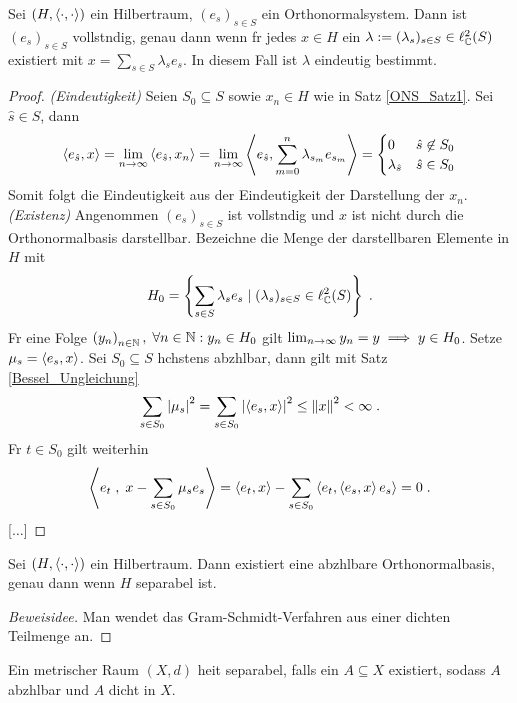 \begin{theorem}
Sei \((H,\left\langle\cdot, \cdot\right\rangle)\) ein Hilbertraum, \((e_s)_{s\in S}\) ein Orthonormalsystem. Dann ist \((e_s)_{s\in S}\) vollst\as ndig, genau dann wenn f\us r jedes \(x\in H\) ein \(\lambda := (\lambda_s)_{s\in S} \in \ell_{\mathbb{C}}^2(S)\) existiert mit \(x = \sum_{s\in S} \lambda_s e_s\). In diesem Fall ist \(\lambda\) eindeutig bestimmt.
\end{theorem}
\begin{proof}
	\textit{(Eindeutigkeit)} Seien \(S_0 \subseteq S\) sowie \(x_n \in H\) wie in Satz \ref{ONS_Satz1}. Sei \(\hat s \in S\), dann
	\[\left\langle e_{\hat s}, x\right\rangle = \lim_{n \to\infty} \left\langle e_{\hat s}, x_n\right\rangle = \lim_{n \to\infty} \left\langle e_{\hat s}, \sum_{m=0}^n \lambda_{s_m} e_{s_m}\right\rangle= \begin{cases}0 & \hat s\not\in S_0 \\ \lambda_{\hat s} & \hat s \in S_0\end{cases}\]
	Somit folgt die Eindeutigkeit aus der Eindeutigkeit der Darstellung der \(x_n\).\\
	\textit{(Existenz)}
	Angenommen \((e_s)_{s\in S} \) ist vollst\as ndig und \(x\) ist nicht durch die Orthonormalbasis darstellbar. Bezeichne die Menge der darstellbaren Elemente in $H$ mit
	\[H_0 = \left\{\sum_{s\in S} \lambda_s e_s \;\vert\; (\lambda_s)_{s\in S} \in \ell^2_{\mathbb{C}}(S)\right\}\;.\]	
	F\us r eine Folge \(\left (y_n\right )_{n\in \mathbb{N}},\; \forall n \in \mathbb{N}: y_n \in H_0\) gilt \(\lim_{n \to \infty} y_n = y \implies y \in H_0\). Setze \(\mu_s = \left\langle e_s, x\right\rangle\). Sei \(S_0 \subseteq S\) h\os chstens abz\as hlbar, dann gilt mit Satz \ref{Bessel_Ungleichung}
	\[\sum_{s\in S_0} \left\lvert \mu_s \right\rvert^2 = \sum_{s\in S_0} \left\lvert \left\langle e_s, x\right\rangle \right\rvert^2 \leq \left\lVert x\right\rVert^2 < \infty\;.\]
	F\us r \(t\in S_0\) gilt weiterhin
	\[\left\langle e_t\;, \;x - \sum_{s\in S_0} \mu_s e_s\right\rangle = \left\langle e_t,x\right\rangle - \sum_{s\in S_0} \left\langle e_t,\left\langle e_s, x\right\rangle e_s\right\rangle = 0 \;. \]
	[\(\ldots\)]
\end{proof}

\begin{theorem}
	Sei \((H,\left\langle\cdot, \cdot\right\rangle)\) ein Hilbertraum. Dann existiert eine abz\as hlbare Orthonormalbasis, genau dann wenn $H$ separabel ist. 
\end{theorem}
\begin{proof}[Beweisidee]
	Man wendet das Gram-Schmidt-Verfahren aus einer dichten Teilmenge an.
\end{proof}
\begin{rem}
	Ein metrischer Raum \((X,d)\) hei\s t separabel, falls ein \(A \subseteq X\) existiert, sodass $A$ abz\as hlbar und $A$ dicht in $X$.
\end{rem}

